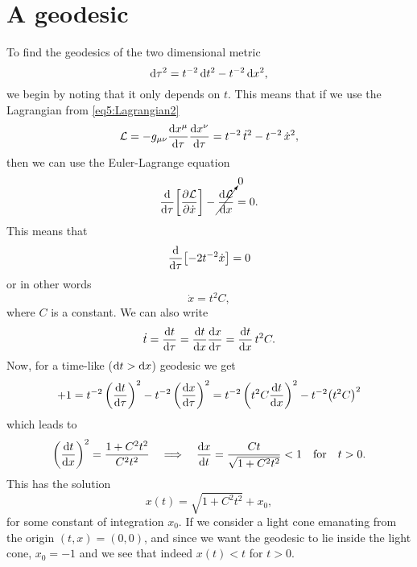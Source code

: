 \documentclass[11pt,a4paper, 
swedish, english %
]{article}
\begin{document}
\section{A geodesic}
To find the geodesics of the two dimensional metric
\begin{equation}
\mathrm{d}\tau^2=t^{-2}\,\mathrm{d}{t}^2 - t^{-2}\,\mathrm{d}{x}^2,
\end{equation}
we begin by noting that it only depends on $t$. This means that if we
use the Lagrangian from \eqref{eq5:Lagrangian2}
\begin{equation}
\mathcal{L}=-g_{\mu\nu}\dv{x^\mu}{\tau}\dv{x^\nu}{\tau}
=t^{-2}\,\dot{t}^2 - t^{-2}\,\dot{x}^2,
\end{equation}
then we can use the Euler-Lagrange equation
\begin{equation}
\dv{\tau}\qty[\pdv{\mathcal{L}}{\dot{x}}]
-\cancelto{0}{\dv{\mathcal{L}}{x}}=0.
\end{equation}
This means that
\begin{equation}
\dv{\tau}\qty[-2t^{-2}\dot{x}]=0
\end{equation}
or in other words
\begin{equation}
\dot{x}=t^2C,
\end{equation}
where $C$ is a constant. We can also write
\begin{equation}
\dot{t}=\dv{t}{\tau}=\dv{t}{x}\dv{x}{\tau}
=\dv{t}{x}\,t^2C.
\end{equation}
Now, for a time-like ($\mathrm{d}{t}>\mathrm{d}{x}$) geodesic we get
\begin{equation}
+1=t^{-2}\,\qty(\dv{t}{\tau})^2
- t^{-2}\,\qty(\dv{x}{\tau})^2
=t^{-2}\,\qty(t^2C\dv{t}{x})^2
- t^{-2}\qty(t^2C)^2
\end{equation}
which leads to
\begin{equation}
\qty(\dv{t}{x})^2=\frac{1+C^2t^2}{C^2t^2}
\quad\Longrightarrow\quad
\dv{x}{t}=\frac{Ct}{\sqrt{1+C^2t^2}}<1\qfor t>0.
\end{equation}
This has the solution
\begin{equation}
x(t)=\sqrt{1+C^2t^2}+x_0,
\end{equation}
for some constant of integration $x_0$. If we consider a light cone
emanating from the origin $(t,x)=(0,0)$, and since we want the
geodesic to lie inside the light cone, $x_0=-1$ and we see that indeed
$x(t)<t$ for $t>0$.
\end{document}
